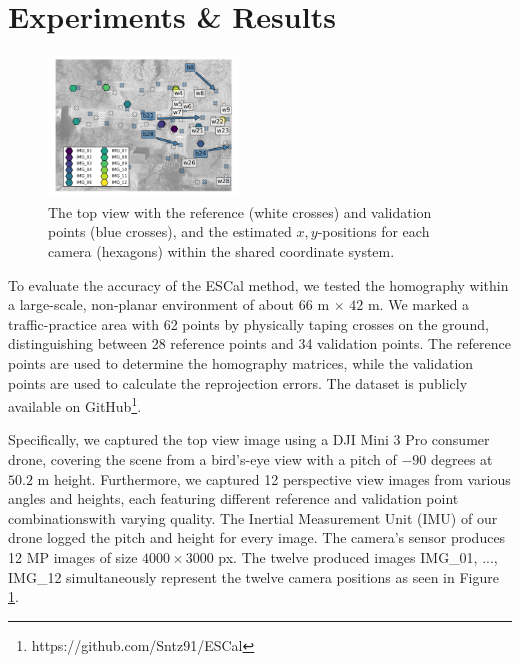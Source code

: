 \section{Experiments \& Results}
\label{sec:experiments}
\begin{figure}
	\begin{center}
		\includegraphics[width=0.45\textwidth]{figures/camera_positions.png}
	\end{center}
	\caption{The top view with the reference (white crosses) and validation points 
	(blue crosses), and the estimated $x,y$-positions for each camera (hexagons) within 
	the shared coordinate system.}
	\label{fig:positions}
\end{figure}

To evaluate the accuracy of the ESCal method, we tested the homography within 
a large-scale, non-planar environment of about $66$ m $\times$ $42$ m.
We marked a traffic-practice area with 62 points by physically taping crosses 
on the ground, distinguishing between 28 reference points and 34 validation points. 
The reference points are used to determine the homography matrices, 
while the validation points are used to calculate the reprojection errors. 
The dataset is publicly available on GitHub\footnote{https://github.com/Sntz91/ESCal}. 

Specifically, we captured the top view image using a DJI Mini 3 Pro consumer drone, 
covering the scene from a bird's-eye view with a pitch of $-90$ degrees at 
$50.2$ m height. Furthermore, we captured 12 
perspective view images from various angles and heights, each featuring 
different reference and validation point combinations\textemdash with varying 
quality. The Inertial Measurement Unit (IMU) of our drone logged the pitch 
and height for every image. The camera's sensor produces 12 MP images of 
size $4000\times3000$ px. The twelve produced images IMG\_01, ..., IMG\_12 
simultaneously represent the twelve camera positions as seen in Figure 
\ref{fig:positions}.







